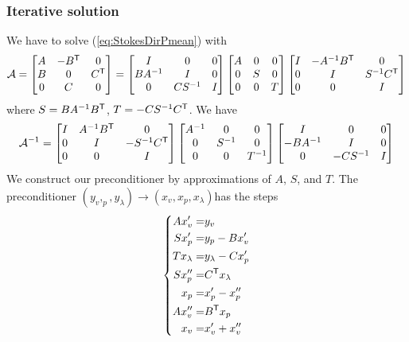 \subsubsection{Iterative solution}
%
We have to solve (\ref{eq:StokesDirPmean}) with 
%
\begin{align*}
\mathcal A = 
\begin{bmatrix}
A  & -{B}^{\mathsf{T}}& 0\\
B & 0 & {C}^{\mathsf{T}}\\
0 & C & 0
\end{bmatrix}
=
\begin{bmatrix}
I  & 0& 0\\
BA^{-1} & I & 0\\
0 & CS^{-1} & I
\end{bmatrix}
\begin{bmatrix}
A  & 0& 0\\
0 & S & 0\\
0 & 0 & T
\end{bmatrix}
\begin{bmatrix}
I  & -A^{-1}{B}^{\mathsf{T}}& 0\\
0 & I & S^{-1}{C}^{\mathsf{T}}\\
0 & 0 & I
\end{bmatrix}
\end{align*}
%
where $S=BA^{-1}{B}^{\mathsf{T}}$, $T=-CS^{-1}{C}^{\mathsf{T}}$. We have
%
\begin{align*}
\mathcal A^{-1} = 
\begin{bmatrix}
I  & A^{-1}{B}^{\mathsf{T}}& 0\\
0 & I & -S^{-1}{C}^{\mathsf{T}}\\
0 & 0 & I
\end{bmatrix}
\begin{bmatrix}
A^{-1}  & 0& 0\\
0 & S^{-1} & 0\\
0 & 0 & T^{-1}
\end{bmatrix}
\begin{bmatrix}
I  & 0& 0\\
-BA^{-1} & I & 0\\
0 & -CS^{-1} & I
\end{bmatrix}
\end{align*}
%
We construct our preconditioner by approximations of $A$, $S$, and $T$. The preconditioner $(y_v,_p,y_{\lambda})\to(x_v,x_p,x_{\lambda})$has the steps
%
\begin{align*}
%
\left\{
\begin{aligned}
A {x_v'} =& y_v\\
S {x_p'} =& y_p - B {x_v'}\\
T x_{\lambda} =& y_{\lambda} - C {x_p'}\\
S x_p'' =& \transpose{C} x_{\lambda}\\
{x_p} =& {x_p'} - x_p''\\
A x_v'' =& \transpose{B} x_p\\
x_v =& x_v' + x_v''
\end{aligned}
\right.
%
\end{align*}
%

%
%
\printbibliography[title=References Section~\thesection]
